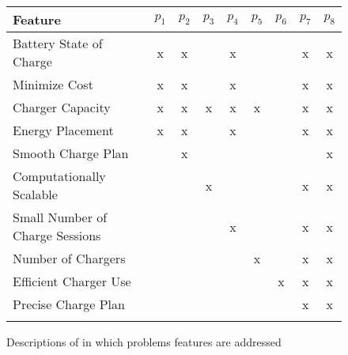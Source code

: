 \begin{figure*}\label{fig:formulation:features}\centering
\newcommand{\grayhline}{\arrayrulecolor{gray!20} \hline \arrayrulecolor{black}}
\begin{tabular}{l c c c c c c c c}
 Feature                        & $p_1$ & $p_2$ & $p_3$ & $p_4$ & $p_5$ & $p_6$ & $p_7$ & $p_8$ \\ \hline 
Battery State of Charge         &   x   &   x   &       &   x   &       &       &   x   &   x   \\ \grayhline      
Minimize Cost                   &   x   &   x   &       &   x   &       &       &   x   &   x   \\ \grayhline           
Charger Capacity                &   x   &   x   &   x   &   x   &   x   &       &   x   &   x   \\ \grayhline      
Energy Placement                &   x   &   x   &       &   x   &       &       &   x   &   x   \\ \grayhline      
Smooth Charge Plan              &       &   x   &       &       &       &       &       &   x   \\ \grayhline      
Computationally Scalable        &       &       &   x   &       &       &       &   x   &   x   \\ \grayhline      
Small Number of Charge Sessions &       &       &       &   x   &       &       &   x   &   x   \\ \grayhline      
Number of Chargers              &       &       &       &       &   x   &       &   x   &   x   \\ \grayhline      
Efficient Charger Use           &       &       &       &       &       &   x   &   x   &   x   \\ \grayhline      
Precise Charge Plan             &       &       &       &       &       &       &   x   &   x   \\ \grayhline      
\end{tabular} 
\caption{Descriptions of in which problems features are addressed}
\label{fig:formulation:features}
\end{figure*}

